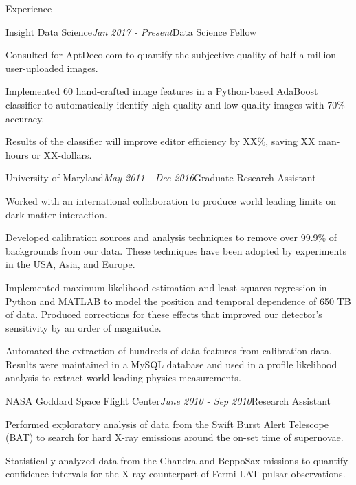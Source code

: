 \documentclass{resume} %
\begin{document}
\begin{rSection}{Experience}

\begin{rSubsection}{Insight Data Science}{\em Jan 2017 - Present}{Data Science Fellow}{ }
\item Consulted for AptDeco.com to quantify the subjective quality of half a million user-uploaded images.
\item Implemented 60 hand-crafted image features in a Python-based AdaBoost classifier to automatically identify high-quality and low-quality images with 70\% accuracy.
\item Results of the classifier will improve editor efficiency by XX\%, saving XX man-hours or XX-dollars.
\end{rSubsection}


\begin{rSubsection}{University of Maryland}{\em May 2011 - Dec 2016}{Graduate Research Assistant}{ }
\item Worked with an international collaboration to produce world leading limits on dark matter interaction.
\item Developed calibration sources and analysis techniques to remove over 99.9\% of backgrounds from our data. These techniques have been adopted by experiments in the USA, Asia, and Europe.
\item Implemented maximum likelihood estimation and least squares regression in Python and MATLAB to model the position and temporal dependence of 650 TB of data. Produced corrections for these effects that improved our detector's sensitivity by an order of magnitude.
\item Automated the extraction of hundreds of data features from calibration data.  Results were maintained in a MySQL database and used in a profile likelihood analysis to extract world leading physics measurements.


\end{rSubsection}


\begin{rSubsection}{NASA Goddard Space Flight Center}{\em June 2010 - Sep 2010}{Research Assistant}{}
\item Performed exploratory analysis of data from the Swift Burst Alert Telescope (BAT) to search for hard X-ray emissions around the on-set time of supernovae.
\item Statistically analyzed data from the Chandra and BeppoSax missions to quantify confidence intervals for the X-ray counterpart of Fermi-LAT pulsar observations.
\end{rSubsection}

\end{rSection}
\end{document}
